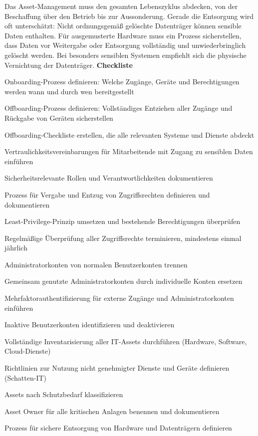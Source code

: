 Das Asset-Management muss den gesamten Lebenszyklus abdecken, von der Beschaffung über den Betrieb bis zur Aussonderung. Gerade die Entsorgung wird oft unterschätzt: Nicht ordnungsgemäß gelöschte Datenträger können sensible Daten enthalten. Für ausgemusterte Hardware muss ein Prozess sicherstellen, dass Daten vor Weitergabe oder Entsorgung vollständig und unwiederbringlich gelöscht werden. Bei besonders sensiblen Systemen empfiehlt sich die physische Vernichtung der Datenträger.
\newpage
\textbf{Checkliste}
\begin{checklist}
\item Onboarding-Prozess definieren: Welche Zugänge, Geräte und Berechtigungen werden wann und durch wen bereitgestellt
\item Offboarding-Prozess definieren: Vollständiges Entziehen aller Zugänge und Rückgabe von Geräten sicherstellen
\item Offboarding-Checkliste erstellen, die alle relevanten Systeme und Dienste abdeckt
\item Vertraulichkeitsvereinbarungen für Mitarbeitende mit Zugang zu sensiblen Daten einführen
\item Sicherheitsrelevante Rollen und Verantwortlichkeiten dokumentieren
\item Prozess für Vergabe und Entzug von Zugriffsrechten definieren und dokumentieren
\item Least-Privilege-Prinzip umsetzen und bestehende Berechtigungen überprüfen
\item Regelmäßige Überprüfung aller Zugriffsrechte terminieren, mindestens einmal jährlich
\item Administratorkonten von normalen Benutzerkonten trennen
\item Gemeinsam genutzte Administratorkonten durch individuelle Konten ersetzen
\item Mehrfaktorauthentifizierung für externe Zugänge und Administratorkonten einführen
\item Inaktive Benutzerkonten identifizieren und deaktivieren
\item Vollständige Inventarisierung aller IT-Assets durchführen (Hardware, Software, Cloud-Dienste)
\item Richtlinien zur Nutzung nicht genehmigter Dienste und Geräte definieren (Schatten-IT)
\item Assets nach Schutzbedarf klassifizieren
\item Asset Owner für alle kritischen Anlagen benennen und dokumentieren
\item Prozess für sichere Entsorgung von Hardware und Datenträgern definieren
\end{checklist}
